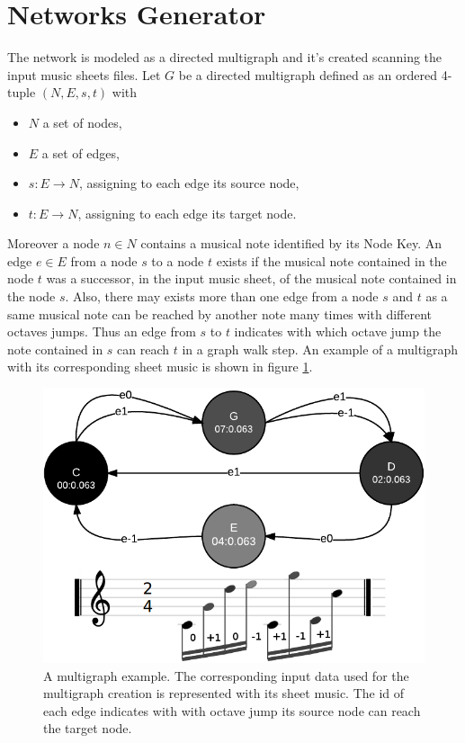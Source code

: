 \documentclass{llncs}
\begin{document}
\section{Networks Generator}
\label{sec:networks}
The network is modeled as a directed multigraph and it's created
scanning the input music sheets files. Let $G$ be a directed
multigraph defined as an ordered 4-tuple $(N,E,s,t)$ with
\begin{itemize}
	\item $N$ a set of nodes,
	\item $E$ a set of edges,
	\item $s: E \rightarrow  N$, assigning to each edge its source node,
	\item $t: E \rightarrow N$, assigning to each edge its target node.
\end{itemize}
Moreover a node $n \in N$ contains a musical note identified by its Node Key.
An edge $e \in E$ from a node $s$ to a node $t$ exists if the musical note
contained in the node $t$ was a successor, in the input music sheet, of the musical note 
contained in the node $s$. Also, there may exists more than one edge from a node $s$ and $t$
as a same musical note can be reached by another note many times with
different octaves jumps. Thus an edge from $s$ to $t$ indicates with which
octave jump the note contained in $s$ can reach $t$ in a graph walk step.
An example of a multigraph with its corresponding sheet music is shown
in figure \ref{fig:multigraph}.
\begin{figure}
\centering
\includegraphics[scale=0.4]{multigraph.png}
\caption{A multigraph example. The corresponding input data used for the multigraph
creation is represented with its sheet music. The id of each edge
indicates with with octave jump its source node can reach the target
node.}
\label{fig:multigraph}
\end{figure}
\end{document}
